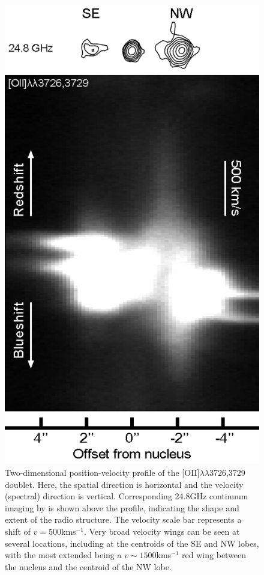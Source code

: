 \begin{figure}[!p]
	\centering
	\includegraphics[width=0.7\linewidth]{figures/xshooter_ic5063/oii_h2_pv_diagram_3.png}
	\caption[Two-dimensional position-velocity profile of the {[}OII{]}$\lambda\lambda$3726,3729 doublet along the radio axis of IC, and corresponding 24.8\;GHz continuum contours.]{Two-dimensional position-velocity profile of the [OII]$\lambda\lambda$3726,3729 doublet. Here, the spatial direction is horizontal and the velocity (spectral) direction is vertical. Corresponding 24.8\;GHz continuum imaging by \citet{Morganti2007} is shown above the profile, indicating the shape and extent of the radio structure. The velocity scale bar represents a shift of $v=500$\;km\;s$^{-1}$. Very broad velocity wings can be seen at several locations, including at the centroids of the SE and NW lobes, with the most extended being a $v\sim1500$\;km\;s$^{-1}$ red wing between the nucleus and the centroid of the NW lobe.}
	\label{fig: xshooter_ic5063: o2_pv_diagram}
\end{figure}

